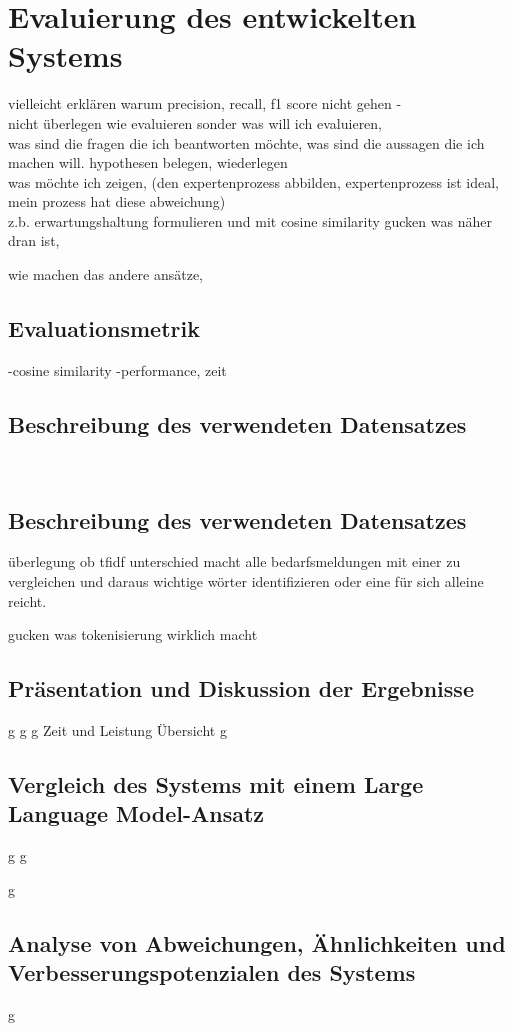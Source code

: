 \chapter{Evaluierung des entwickelten Systems}
\label{chap:evaluierung}

vielleicht erklären warum precision, recall, f1 score nicht gehen -\\

nicht überlegen wie evaluieren sonder was will ich evaluieren,\\
was sind die fragen die ich beantworten möchte, was sind die aussagen die ich machen will. hypothesen belegen, wiederlegen\\
was möchte ich zeigen, (den expertenprozess abbilden, expertenprozess ist ideal, mein prozess hat diese abweichung)\\

z.b. erwartungshaltung formulieren und mit cosine similarity gucken was näher dran ist,

wie machen das andere ansätze,

\section{Evaluationsmetrik}
-cosine similarity
-performance, zeit

\section{Beschreibung des verwendeten Datensatzes}
\\
\newpage

\section{Beschreibung des verwendeten Datensatzes}

überlegung ob tfidf unterschied macht alle bedarfsmeldungen mit einer zu vergleichen und daraus wichtige wörter identifizieren oder eine für sich alleine reicht.

gucken was tokenisierung wirklich macht
\section{Präsentation und Diskussion der Ergebnisse}
\newpage
g
\newpage
g
\newpage
g
\newpage
Zeit und Leistung Übersicht
\newpage
g
\newpage

\section{Vergleich des Systems mit einem Large Language Model-Ansatz}
\newpage
g
\newpage
g
\newpage

g
\newpage

\section{Analyse von Abweichungen, Ähnlichkeiten und Verbesserungspotenzialen des Systems}
\newpage
g
\newpage